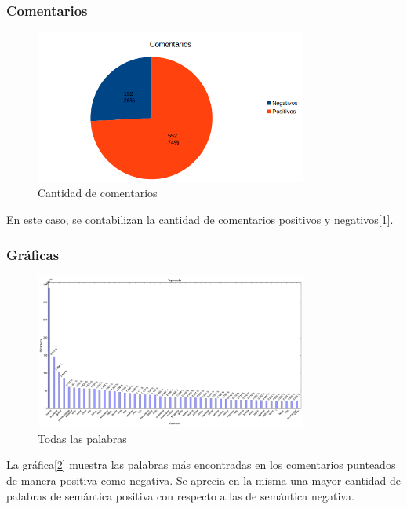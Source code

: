 \documentclass[12pt]{article}
\begin{document}
\subsubsection{Comentarios}
\begin{figure}[!h]
  \centering
    \includegraphics[width=0.8\textwidth]{./fig/Comentarios.png}
  \caption{Cantidad de comentarios}
  \label{fig:com}
\end{figure} 
En este caso, se contabilizan la cantidad de comentarios positivos y negativos[\ref{fig:com}].

\subsubsection{Gráficas}


\begin{figure}[!h]
  \centering
    \includegraphics[width=0.8\textwidth]{./fig/AllWords.png}
  \caption{Todas las palabras}
  \label{fig:todas}
\end{figure} 
La gráfica[\ref{fig:todas}] muestra las palabras más encontradas en los comentarios punteados de manera positiva como negativa. Se aprecia en la misma una mayor cantidad de palabras de semántica positiva con respecto a las de semántica negativa.
\end{document}
